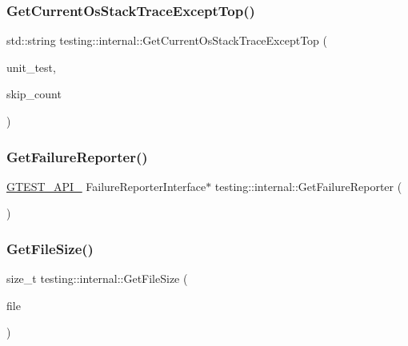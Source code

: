 \mbox{\label{namespacetesting_1_1internal_aeb475922b8cd1e6c60ac052bbc396e62}} 
\subsubsection{\texorpdfstring{GetCurrentOsStackTraceExceptTop()}{GetCurrentOsStackTraceExceptTop()}}
{\footnotesize\ttfamily std\+::string testing\+::internal\+::\+Get\+Current\+Os\+Stack\+Trace\+Except\+Top (\begin{DoxyParamCaption}\item[{\mbox{\hyperlink{classtesting_1_1UnitTest}{Unit\+Test}} $\ast$}]{unit\+\_\+test,  }\item[{int}]{skip\+\_\+count }\end{DoxyParamCaption})}

\mbox{\label{namespacetesting_1_1internal_aa261c22df383e9007129c92e36e30e62}} 
\subsubsection{\texorpdfstring{GetFailureReporter()}{GetFailureReporter()}}
{\footnotesize\ttfamily \mbox{\hyperlink{gtest-port_8h_aa73be6f0ba4a7456180a94904ce17790}{G\+T\+E\+S\+T\+\_\+\+A\+P\+I\+\_\+}} Failure\+Reporter\+Interface$\ast$ testing\+::internal\+::\+Get\+Failure\+Reporter (\begin{DoxyParamCaption}{ }\end{DoxyParamCaption})}

\mbox{\label{namespacetesting_1_1internal_a06ca3f65f5e85c9ce7299b9e4cd52408}} 
\subsubsection{\texorpdfstring{GetFileSize()}{GetFileSize()}}
{\footnotesize\ttfamily size\+\_\+t testing\+::internal\+::\+Get\+File\+Size (\begin{DoxyParamCaption}\item[{F\+I\+LE $\ast$}]{file }\end{DoxyParamCaption})}


